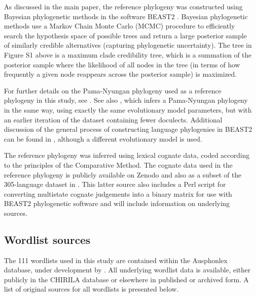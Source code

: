 As discussed in the main paper, the reference phylogeny was constructed
using Bayesian phylogenetic methods in the software BEAST2
\autocite{bouckaert_beast_2014}. Bayesian phylogenetic methods use a
Markov Chain Monte Carlo (MCMC) procedure to efficiently search the
hypothesis space of possible trees and return a large posterior sample
of similarly credible alternatives (capturing phylogenetic uncertainty).
The tree in Figure S1 above is a maximum clade credibility tree, which
is a summation of the posterior sample where the likelihood of all nodes
in the tree (in terms of how frequently a given node reappears across
the posterior sample) is maximized.

For further details on the Pama-Nyungan phylogeny used as a reference
phylogeny in this study, see \textcite{bowern_pama-nyungan_2015}. See
also \textcite{bowern_computational_2012}, which infers a Pama-Nyungan
phylogeny in the same way, using exactly the same evolutionary model
parameters, but with an earlier iteration of the dataset containing
fewer doculects. Additional discussion of the general process of
constructing language phylogenies in BEAST2 can be found in
\textcite{bouckaert_origin_2018}, although a different evolutionary
model is used.

The reference phylogeny was inferred using lexical cognate data, coded
according to the principles of the Comparative Method. The cognate data
used in the reference phylogeny is publicly available on Zenodo
\autocite{bowern_pama-nyungan_2018} and also as a subset of the
305-language dataset in \textcite{bouckaert_origin_2018}. This latter
source also includes a Perl script for converting multistate cognate
judgements into a binary matrix for use with BEAST2 phylogenetic
software and will include information on underlying sources.

\newpage

\hypertarget{phy-sig-wordlist-sources}{%
\subsection*{Wordlist sources}\label{phy-sig-wordlist-sources}}

The 111 wordlists used in this study are contained within the Ausphonlex
database, under development by \textcite{round_ausphon-lexicon_2017}.
All underlying wordlist data is available, either publicly in the
CHIRILA database \autocite{bowern_chirila_2016} or elsewhere in
published or archived form. A list of original sources for all wordlists
is presented below.


